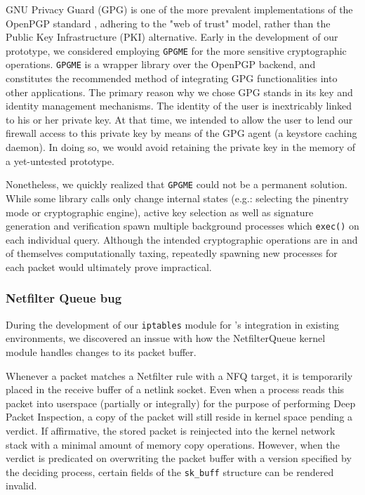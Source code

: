 GNU Privacy Guard (GPG) is one of the more prevalent implementations of the OpenPGP standard \cite{rfc4880}, adhering to the "web of trust" model, rather than the Public Key Infrastructure (PKI) \cite{maurer1996modelling} alternative. Early in the development of our prototype, we considered employing \texttt{GPGME} for the more sensitive cryptographic operations. \texttt{GPGME} is a wrapper library over the OpenPGP backend, and constitutes the recommended method of integrating GPG functionalities into other applications. The primary reason why we chose GPG stands in its key and identity management mechanisms. The identity of the user is inextricably linked to his or her private key. At that time, we intended to allow the user to lend our firewall access to this private key by means of the GPG agent (a keystore caching daemon). In doing so, we would avoid retaining the private key in the memory of a yet-untested prototype.

Nonetheless, we quickly realized that \texttt{GPGME} could not be a permanent solution. While some library calls only change internal states (e.g.: selecting the pinentry mode or cryptographic engine), active key selection as well as signature generation and verification spawn multiple background processes which \texttt{exec()} on each individual query. Although the intended cryptographic operations are in and of themselves computationally taxing, repeatedly spawning new processes for each packet would ultimately prove impractical.


\subsubsection{Netfilter Queue bug}
\label{sign:linux:discussion:bug}

During the development of our \texttt{iptables} module for \daf{}'s integration in existing environments, we discovered an inssue with how the NetfilterQueue kernel module handles changes to its packet buffer.

Whenever a packet matches a Netfilter rule with a NFQ target, it is temporarily placed in the receive buffer of a netlink socket. Even when a process reads this packet into userspace (partially or integrally) for the purpose of performing Deep Packet Inspection, a copy of the packet will still reside in kernel space pending a verdict. If affirmative, the stored packet is reinjected into the kernel network stack with a minimal amount of memory copy operations. However, when the verdict is predicated on overwriting the packet buffer with a version specified by the deciding process, certain fields of the \texttt{sk\_buff} structure can be rendered invalid.

